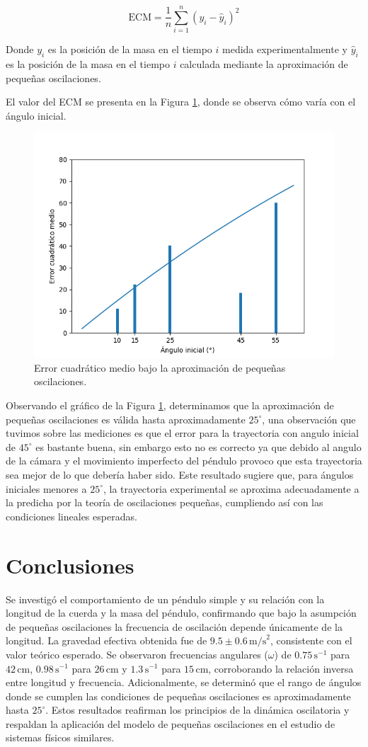 \documentclass[12pt,a4]{article}
\begin{document}
\[
\text{ECM} = \frac{1}{n} \sum_{i=1}^{n} (y_i - \hat{y}_i)^2
\]

Donde $y_i$ es la posición de la masa en el tiempo $i$ medida experimentalmente y $\hat{y}_i$ es la posición de la masa en el tiempo $i$ calculada mediante la aproximación de pequeñas oscilaciones.

El valor del ECM se presenta en la Figura \ref{fig:pequeñas_oscilaciones}, donde se observa cómo varía con el ángulo inicial.

\begin{figure}[H]
    \centering
    \includegraphics[width=0.6\linewidth]{peq_oscilaciones.png}
    \caption{Error cuadrático medio bajo la aproximación de pequeñas oscilaciones.}
    \label{fig:pequeñas_oscilaciones}
\end{figure}

Observando el gráfico de la Figura \ref{fig:pequeñas_oscilaciones}, determinamos que la aproximación de pequeñas oscilaciones es válida hasta aproximadamente $25^\circ$, una observación que tuvimos sobre las mediciones es que el error para la trayectoria con angulo inicial de $45^\circ$ es bastante buena, sin embargo esto no es correcto ya que debido al angulo de la cámara y el movimiento imperfecto del péndulo provoco que esta trayectoria sea mejor de lo que debería haber sido. Este resultado sugiere que, para ángulos iniciales menores a $25^\circ$, la trayectoria experimental se aproxima adecuadamente a la predicha por la teoría de oscilaciones pequeñas, cumpliendo así con las condiciones lineales esperadas.

\section{Conclusiones}

Se investigó el comportamiento de un péndulo simple y su relación con la longitud de la cuerda y la masa del péndulo, confirmando que bajo la asumpción de pequeñas oscilaciones la frecuencia de oscilación depende únicamente de la longitud. La gravedad efectiva obtenida fue de \(9.5 \pm 0.6 \, \text{m/s}^2\), consistente con el valor teórico esperado. Se observaron frecuencias angulares (\(\omega\)) de \(0.75 \, \text{s}^{-1}\) para \(42 \, \text{cm}\), \(0.98 \, \text{s}^{-1}\) para \(26 \, \text{cm}\) y \(1.3 \, \text{s}^{-1}\) para \(15 \, \text{cm}\), corroborando la relación inversa entre longitud y frecuencia. Adicionalmente, se determinó que el rango de ángulos donde se cumplen las condiciones de pequeñas oscilaciones es aproximadamente hasta $25^\circ$. Estos resultados reafirman los principios de la dinámica oscilatoria y respaldan la aplicación del modelo de pequeñas oscilaciones en el estudio de sistemas físicos similares.
\end{document}
